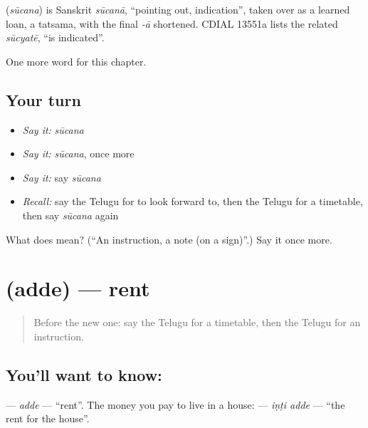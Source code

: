 \begin{cousinweb}
\textbf{} (\emph{sūcana}) is Sanskrit \emph{sūcanā}, \textquotedblleft{}pointing out, indication\textquotedblright{}, taken over as a learned loan, a tatsama, with the final \emph{-ā} shortened. CDIAL 13551a lists the related \emph{sūcyatē}, \textquotedblleft{}is indicated\textquotedblright{}.
\end{cousinweb}

\begin{grammarlens}[title={What you've built}]
One more word for this chapter.
\end{grammarlens}

\subsection*{Your turn}
\begin{itemize}
\raggedright
  \item \emph{Say it:} \emph{sūcana}
  \item \emph{Say it:} \emph{sūcana}, once more
  \item \emph{Say it:} say \emph{sūcana}
  \item \emph{Recall:} say the Telugu for to look forward to, then the Telugu for a timetable, then say \emph{sūcana} again
\end{itemize}

\begin{tcolorbox}[breakable,colback=teal!4,colframe=teal!35!black,title={Before you move on}]
What does  mean? (\textquotedblleft{}An instruction, a note (on a sign)\textquotedblright{}.) Say it once more.
\end{tcolorbox}
\section[\texorpdfstring{\te{అద్దె} (adde)}{అద్దె (adde)}]{ (adde) — rent}

\label{lesson:TE-C156-adde}



\begin{quote}
Before the new one: say the Telugu for a timetable, then the Telugu for an instruction.
\end{quote}

\subsection*{You'll want to know: }
\textbf{} — \emph{adde} — \textquotedblleft{}rent\textquotedblright{}. The money you pay to live in a house: \textbf{ } — \emph{iṇṭi adde} — \textquotedblleft{}the rent for the house\textquotedblright{}.


